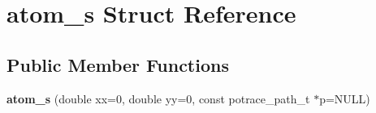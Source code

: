 \hypertarget{structatom__s}{\section{atom\-\_\-s Struct Reference}
\label{structatom__s}
}
\subsection*{Public Member Functions}
\begin{DoxyCompactItemize}
\item 
\hypertarget{structatom__s_a2716535df021ee8aa5745f171217a445}{{\bfseries atom\-\_\-s} (double xx=0, double yy=0, const potrace\-\_\-path\-\_\-t $\ast$p=N\-U\-L\-L)}\label{structatom__s_a2716535df021ee8aa5745f171217a445}

\end{DoxyCompactItemize}
